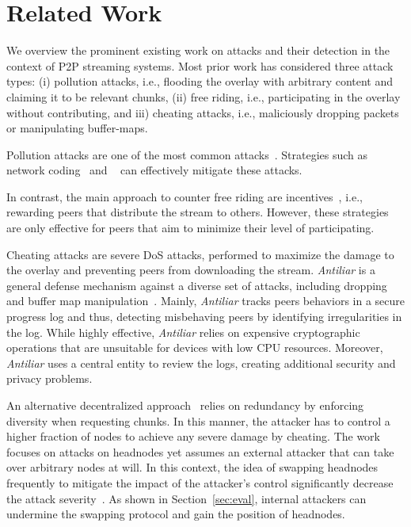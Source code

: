 \section{Related Work}
\label{sec:related}

We overview the prominent existing work on attacks and their detection in the context of P2P streaming systems. Most prior work has considered three attack types: (i) pollution attacks, i.e., flooding the overlay with arbitrary content and claiming it to be relevant chunks, (ii) free riding, i.e., participating in the overlay without contributing, and iii) cheating attacks, i.e., maliciously dropping packets or manipulating buffer-maps. 

Pollution attacks are one of the most common attacks~\cite{pollution1}. Strategies such as network coding~\cite{nc} and ~\cite{pollution2} can effectively mitigate these attacks. 

In contrast, the main approach to counter free riding are incentives~\cite{defending,defending2}, i.e., rewarding peers that distribute the stream to others. 
However, these strategies are only effective for peers that aim to minimize their level of participating. 

  
Cheating attacks are severe DoS attacks, performed to maximize the damage to the overlay and preventing peers from downloading the stream.   
\textit{Antiliar} is a general defense mechanism against a diverse set of attacks, including dropping and buffer map manipulation~\cite{antiliar}.
Mainly, \textit{Antiliar} tracks peers behaviors in a secure progress log and thus, detecting misbehaving peers by identifying irregularities in the log. 
While highly effective, \textit{Antiliar} relies on expensive cryptographic operations that are unsuitable for devices with low CPU resources.
Moreover, \textit{Antiliar} uses a central entity to review the logs, creating additional security and privacy problems. 


An alternative  decentralized approach~\cite{nguyen2014resilience} relies on redundancy by enforcing diversity when requesting chunks. 
In this manner, the attacker has to control a higher fraction of nodes to achieve any severe damage by cheating.
The work focuses on attacks on headnodes yet assumes an external attacker that can take over arbitrary nodes at will.
In this context, the idea of swapping headnodes frequently to mitigate the impact of the attacker's control significantly decrease the attack severity~\cite{nguyen2016swap}.
As shown in Section~\ref{sec:eval}, internal attackers can undermine the swapping protocol and gain the position of headnodes.  
